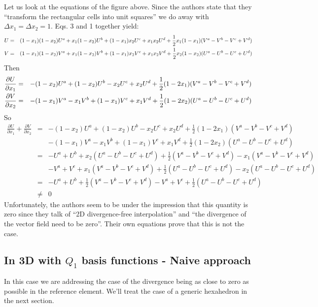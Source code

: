 Let us look at the equations of the figure above. 
Since the authors state that they ``transform the rectangular cells into unit squares'' 
we do away with $\Delta x_1 = \Delta x_2 = 1$. Eqs. 3 and 1 together yield:
\begin{eqnarray}
U&=&(1-x_1)(1-x_2) U^a+x_1(1-x_2)U^b + (1-x_1)x_2 U^c + x_1x_2 U^d
+ \frac12 x_1(1-x_1)(V^a-V^b-V^c+V^d) \nonumber\\
V&=&(1-x_1)(1-x_2) V^a+x_1(1-x_2)V^b + (1-x_1)x_2 V^c + x_1x_2 V^d
+ \frac12 x_2(1-x_2)(U^a-U^b-U^c+U^d) \nonumber
\end{eqnarray}
Then 
\begin{eqnarray}
\frac{\partial U}{\partial x_1} 
&=& -(1-x_2) U^a+(1-x_2)U^b -x_2 U^c + x_2 U^d + \frac12 (1-2x_1)(V^a-V^b-V^c+V^d) \nonumber\\
\frac{\partial V}{\partial x_2}
&=& -(1-x_1) V^a - x_1V^b + (1-x_1) V^c + x_1 V^d + \frac12 (1-2x_2)(U^a-U^b-U^c+U^d) \nonumber
\end{eqnarray}
So 
\begin{eqnarray}
\frac{\partial U}{\partial x_1} \! + \! \frac{\partial V}{\partial x_2} 
&=&
-(1-x_2) U^a+(1-x_2)U^b -x_2 U^c + x_2 U^d + \frac12 (1-2x_1)(V^a-V^b-V^c+V^d) \nonumber\\
&&-(1-x_1) V^a - x_1V^b + (1-x_1) V^c + x_1 V^d + \frac12 (1-2x_2)(U^a-U^b-U^c+U^d) \nonumber\\
&=& -U^a + U^b + x_2(U^a-U^b-U^c+U^d) + \frac12 (V^a-V^b-V^c+V^d)
-x_1 (V^a-V^b-V^c+V^d) \nonumber\\
&& -V^a+V^c + x_1(V^a-V^b-V^c+V^d) + \frac12 (U^a-U^b-U^c+U^d)
-x_2 (U^a-U^b-U^c+U^d) \nonumber\\
&=& -U^a + U^b  + \frac12 (V^a-V^b-V^c+V^d)
 -V^a+V^c  + \frac12 (U^a-U^b-U^c+U^d) \nonumber\\
 &\neq & 0
\end{eqnarray}
Unfortunately, the authors seem to be under the impression that 
this quantity is zero since they talk of ``2D divergence-free interpolation'' 
and ``the divergence of the vector field need to be
zero''. Their own equations prove that this is not the case.


\subsection{In 3D with $Q_1$ basis functions - Naive approach}

In this case we are addressing the case of the divergence being as close 
to zero as possible in the reference element. We'll treat the  
case of a generic hexahedron in the next section. 

